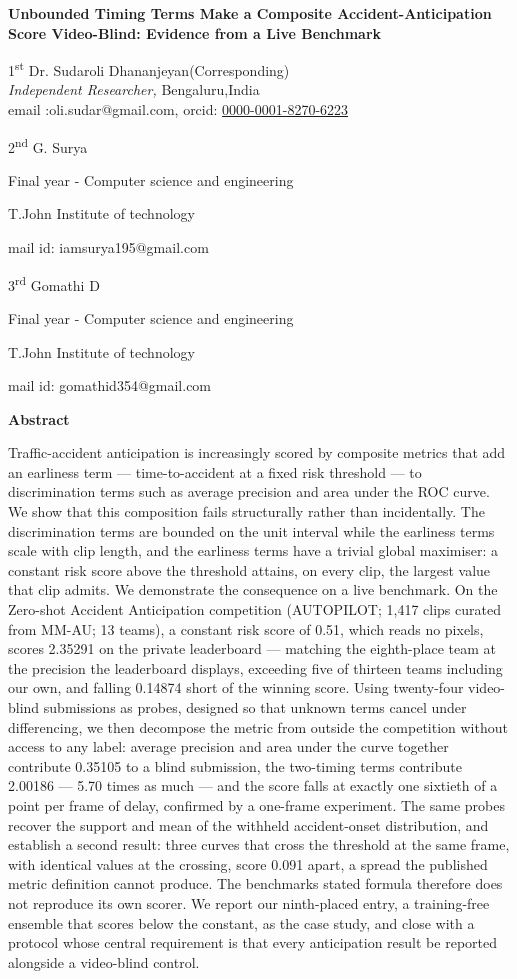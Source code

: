 \textbf{Unbounded Timing Terms Make a Composite Accident-Anticipation Score Video-Blind: Evidence from a Live Benchmark}

1\textsuperscript{st} Dr. Sudaroli Dhananjeyan(Corresponding)\\
\emph{Independent Researcher,} Bengaluru,India\\
email :oli.sudar@gmail.com, orcid: \href{https://orcid.org/0000-0001-8270-6223}{0000-0001-8270-6223}

2\textsuperscript{nd} G. Surya

Final year - Computer science and engineering

T.John Institute of technology

mail id: iamsurya195@gmail.com

3\textsuperscript{rd} Gomathi D

Final year - Computer science and engineering

T.John Institute of technology

mail id: gomathid354@gmail.com

\textbf{Abstract}

Traffic-accident anticipation is increasingly scored by composite metrics that add an earliness term --- time-to-accident at a fixed risk threshold --- to discrimination terms such as average precision and area under the ROC curve. We show that this composition fails structurally rather than incidentally. The discrimination terms are bounded on the unit interval while the earliness terms scale with clip length, and the earliness terms have a trivial global maximiser: a constant risk score above the threshold attains, on every clip, the largest value that clip admits. We demonstrate the consequence on a live benchmark. On the Zero-shot Accident Anticipation competition (AUTOPILOT; 1,417 clips curated from MM-AU; 13 teams), a constant risk score of 0.51, which reads no pixels, scores 2.35291 on the private leaderboard --- matching the eighth-place team at the precision the leaderboard displays, exceeding five of thirteen teams including our own, and falling 0.14874 short of the winning score. Using twenty-four video-blind submissions as probes, designed so that unknown terms cancel under differencing, we then decompose the metric from outside the competition without access to any label: average precision and area under the curve together contribute 0.35105 to a blind submission, the two-timing terms contribute 2.00186 --- 5.70 times as much --- and the score falls at exactly one sixtieth of a point per frame of delay, confirmed by a one-frame experiment. The same probes recover the support and mean of the withheld accident-onset distribution, and establish a second result: three curves that cross the threshold at the same frame, with identical values at the crossing, score 0.091 apart, a spread the published metric definition cannot produce. The benchmark\textquotesingle s stated formula therefore does not reproduce its own scorer. We report our ninth-placed entry, a training-free ensemble that scores below the constant, as the case study, and close with a protocol whose central requirement is that every anticipation result be reported alongside a video-blind control.

